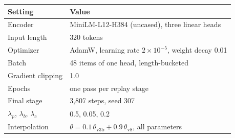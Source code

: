\begin{tabular}{@{}p{}p{}@{}}
\toprule
Setting & Value \\
\midrule
Encoder & MiniLM-L12-H384 (uncased), three linear heads \\
Input length & 320 tokens \\
Optimizer & AdamW, learning rate $2{\times}10^{-5}$, weight decay 0.01 \\
Batch & 48 items of one head, length-bucketed \\
Gradient clipping & 1.0 \\
Epochs & one pass per replay stage \\
Final stage & 3,807 steps, seed 307 \\
$\lambda_p$, $\lambda_b$, $\lambda_c$ & 0.5, 0.05, 0.2 \\
Interpolation & $\theta = 0.1\,\theta_{\text{v3b}} + 0.9\,\theta_{\text{v8}}$, all parameters \\
\bottomrule
\end{tabular}
